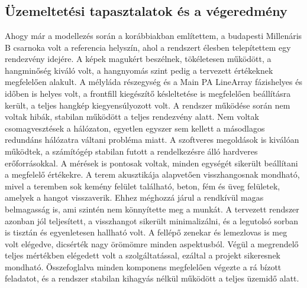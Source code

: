 \chapter{\FurtherDevelopment}
\section{Üzemeltetési tapasztalatok és a végeredmény} %
Ahogy már a modellezés során a korábbiakban említettem, a budapesti Millenáris B csarnoka 
volt a referencia helyszín, ahol a rendszert élesben telepítettem egy rendezvény idejére.
A képek magukért beszélnek, tökéletesen működött, a hangminőség kiváló volt, a hangnyomás szint pedig
a tervezett értékeknek megfelelően alakult. A mélyláda részegység és a Main PA LineArray fázishelyes és időben is helyes
volt, a frontfill kiegészítő késleltetése is megfelelően beállításra került, a teljes hangkép kiegyensúlyozott volt.
A rendszer működése során nem voltak hibák, stabilan működött a teljes rendezvény alatt. 
Nem voltak csomagvesztések a hálózaton, egyetlen egyszer sem kellett a másodlagos redundáns hálózatra váltani probléma miatt.
A szoftveres megoldások is kiválóan működtek, a számítógép stabilan futott a
rendelkezésre álló hardveres erőforrásokkal. A mérések is pontosak voltak, minden egységét
sikerült beállítani a megfelelő értékekre. 
A terem akusztikája alapvetően visszhangosnak mondható, mivel a teremben sok kemény felület található,
beton, fém és üveg felületek, amelyek a hangot visszaverik. Ehhez méghozzá járul a rendkívül magas belmagasság is,
ami szintén nem könnyítette meg a munkát. A tervezett rendszer azonban jól teljesített, a visszhangot sikerült minimalizálni,
és a legutolsó sorban is tisztán és egyenletesen hallható volt.
A fellépő zenekar és lemezlovas is meg volt elégedve, dicsérték nagy örömömre minden aspektusból.
Végül a megrendelő teljes mértékben elégedett volt a szolgáltatással, ezáltal 
a projekt sikeresnek mondható.
Összefoglalva minden komponens megfelelően végezte a rá bízott feladatot, és a rendszer
stabilan kihagyás nélkül működött a teljes üzemidő alatt. 
